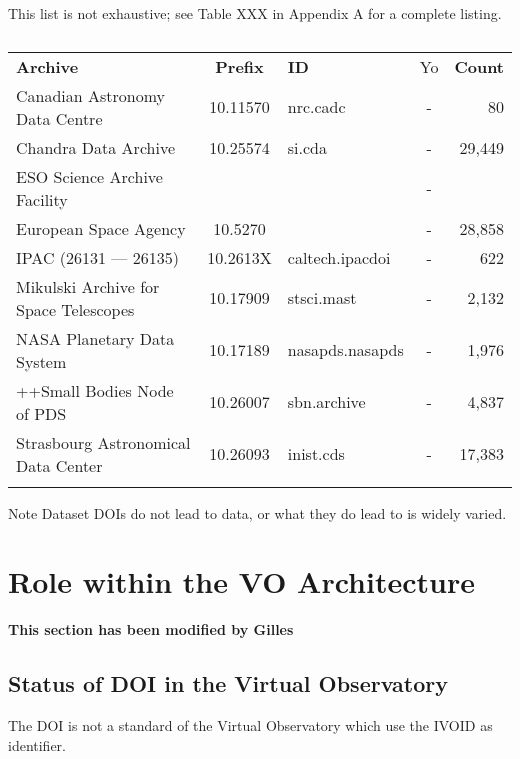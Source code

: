\documentclass[11pt,a4paper]{ivoa}
\begin{document}
This list is not exhaustive; see Table XXX in Appendix A for a complete listing. 

\begin{table}[th]
\begin{tabular}{lclcr}
\sptablerule
\textbf{Archive} & \textbf{Prefix} & \textbf{ID} & Yo & \textbf{Count} \\
\sptablerule
Canadian Astronomy Data Centre        & 10.11570 & nrc.cadc        & - &     80   \\
Chandra Data Archive                  & 10.25574 & si.cda          & - & 29,449   \\
ESO Science Archive Facility          &          &                 & - &          \\
European Space Agency                 & 10.5270  &                 & - & 28,858   \\
IPAC (26131 --- 26135)                & 10.2613X & caltech.ipacdoi & - &    622   \\
Mikulski Archive for Space Telescopes & 10.17909 & stsci.mast      & - &  2,132   \\
NASA Planetary Data System            & 10.17189 & nasapds.nasapds & - &  1,976   \\
++Small Bodies Node of PDS            & 10.26007 & sbn.archive     & - &  4,837   \\
Strasbourg Astronomical Data Center   & 10.26093 & inist.cds       & - & 17,383   \\
\sptablerule
\end{tabular}%
\caption{\label{tab:astroDOIs1}}
\end{table}


\begin{admonition}{Note}
Dataset DOIs do not lead to data, or what they do lead to is widely varied.
\end{admonition}

\section{Role within the VO Architecture}
\textbf{\color{red}This section has been modified by Gilles}

\subsection{Status of DOI in the Virtual Observatory}
The DOI is not a standard of the Virtual Observatory which use the IVOID as identifier.
\end{document}

